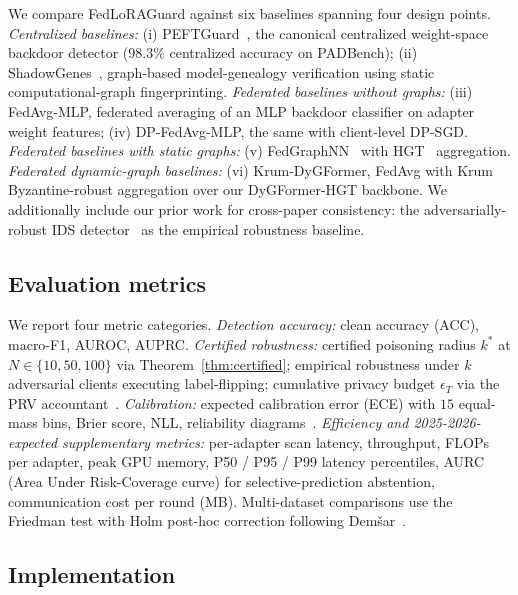 \documentclass[12pt,a4paper]{article}
\theoremstyle{definition}
\theoremstyle{remark}
\newcommand{\modelname}{FedLoRAGuard}
\begin{document}
We compare \modelname{} against six baselines spanning four design points. \emph{Centralized baselines:} (i) PEFTGuard~\cite{sun2025peftguard}, the canonical centralized weight-space backdoor detector ($98.3\%$ centralized accuracy on PADBench); (ii) ShadowGenes~\cite{schulz2025shadowgenes}, graph-based model-genealogy verification using static computational-graph fingerprinting. \emph{Federated baselines without graphs:} (iii) FedAvg-MLP, federated averaging of an MLP backdoor classifier on adapter weight features; (iv) DP-FedAvg-MLP, the same with client-level DP-SGD. \emph{Federated baselines with static graphs:} (v) FedGraphNN~\cite{he2021fedgraphnn} with HGT~\cite{hu2020hgt} aggregation. \emph{Federated dynamic-graph baselines:} (vi) Krum-DyGFormer, FedAvg with Krum~\cite{blanchard2017machine} Byzantine-robust aggregation over our DyGFormer-HGT backbone. We additionally include our prior work for cross-paper consistency: the adversarially-robust IDS detector~\cite{anaedevha2024adversarial} as the empirical robustness baseline.

\subsection{Evaluation metrics}

We report four metric categories. \emph{Detection accuracy:} clean accuracy (ACC), macro-F1, AUROC, AUPRC. \emph{Certified robustness:} certified poisoning radius $k^*$ at $N \in \{10, 50, 100\}$ via Theorem~\ref{thm:certified}; empirical robustness under $k$ adversarial clients executing label-flipping; cumulative privacy budget $\epsilon_T$ via the PRV accountant~\cite{gopi2021numerical}. \emph{Calibration:} expected calibration error (ECE) with $15$ equal-mass bins, Brier score, NLL, reliability diagrams~\cite{guo2017calibration}. \emph{Efficiency and 2025-2026-expected supplementary metrics:} per-adapter scan latency, throughput, FLOPs per adapter, peak GPU memory, P50 / P95 / P99 latency percentiles, AURC (Area Under Risk-Coverage curve) for selective-prediction abstention, communication cost per round (MB). Multi-dataset comparisons use the Friedman test with Holm post-hoc correction following Dem\v{s}ar~\cite{demsar2006statistical}.

\subsection{Implementation}
\end{document}
